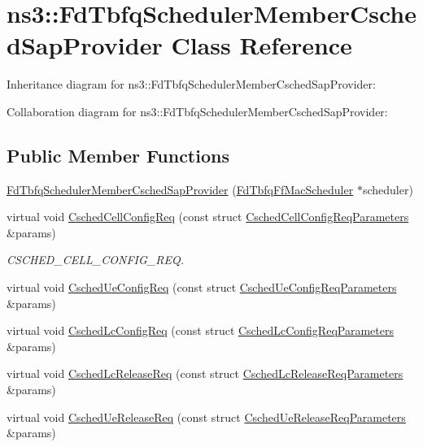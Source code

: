 \hypertarget{classns3_1_1FdTbfqSchedulerMemberCschedSapProvider}{}\section{ns3\+:\+:Fd\+Tbfq\+Scheduler\+Member\+Csched\+Sap\+Provider Class Reference}
\label{classns3_1_1FdTbfqSchedulerMemberCschedSapProvider}


Inheritance diagram for ns3\+:\+:Fd\+Tbfq\+Scheduler\+Member\+Csched\+Sap\+Provider\+:


Collaboration diagram for ns3\+:\+:Fd\+Tbfq\+Scheduler\+Member\+Csched\+Sap\+Provider\+:
\subsection*{Public Member Functions}
\begin{DoxyCompactItemize}
\item 
\hyperlink{classns3_1_1FdTbfqSchedulerMemberCschedSapProvider_a2f99beb9b02325aa22f8d58ff5025db2}{Fd\+Tbfq\+Scheduler\+Member\+Csched\+Sap\+Provider} (\hyperlink{classns3_1_1FdTbfqFfMacScheduler}{Fd\+Tbfq\+Ff\+Mac\+Scheduler} $\ast$scheduler)
\item 
virtual void \hyperlink{classns3_1_1FdTbfqSchedulerMemberCschedSapProvider_a31bd439d98e69afbfcc81a2a6bbb9651}{Csched\+Cell\+Config\+Req} (const struct \hyperlink{structns3_1_1FfMacCschedSapProvider_1_1CschedCellConfigReqParameters}{Csched\+Cell\+Config\+Req\+Parameters} \&params)
\begin{DoxyCompactList}\small\item\em C\+S\+C\+H\+E\+D\+\_\+\+C\+E\+L\+L\+\_\+\+C\+O\+N\+F\+I\+G\+\_\+\+R\+EQ. \end{DoxyCompactList}\item 
virtual void \hyperlink{classns3_1_1FdTbfqSchedulerMemberCschedSapProvider_a3edf1a0eb6154b0e202d694acf3b1bc3}{Csched\+Ue\+Config\+Req} (const struct \hyperlink{structns3_1_1FfMacCschedSapProvider_1_1CschedUeConfigReqParameters}{Csched\+Ue\+Config\+Req\+Parameters} \&params)
\item 
virtual void \hyperlink{classns3_1_1FdTbfqSchedulerMemberCschedSapProvider_a1a2f087eb49da418084793cc3b42cd8f}{Csched\+Lc\+Config\+Req} (const struct \hyperlink{structns3_1_1FfMacCschedSapProvider_1_1CschedLcConfigReqParameters}{Csched\+Lc\+Config\+Req\+Parameters} \&params)
\item 
virtual void \hyperlink{classns3_1_1FdTbfqSchedulerMemberCschedSapProvider_a8418f805b0ab0532bd7f87bb8362856d}{Csched\+Lc\+Release\+Req} (const struct \hyperlink{structns3_1_1FfMacCschedSapProvider_1_1CschedLcReleaseReqParameters}{Csched\+Lc\+Release\+Req\+Parameters} \&params)
\item 
virtual void \hyperlink{classns3_1_1FdTbfqSchedulerMemberCschedSapProvider_ae92dc99690227f23004682a871f9514c}{Csched\+Ue\+Release\+Req} (const struct \hyperlink{structns3_1_1FfMacCschedSapProvider_1_1CschedUeReleaseReqParameters}{Csched\+Ue\+Release\+Req\+Parameters} \&params)
\end{DoxyCompactItemize}
